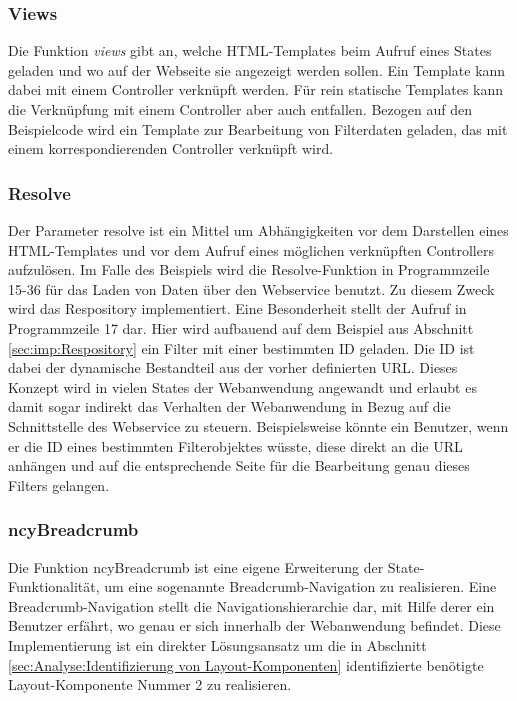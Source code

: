 \subsubsection{Views}

Die Funktion \emph{views} gibt an, welche HTML-Templates beim Aufruf eines States geladen und wo auf der Webseite sie angezeigt werden sollen. Ein Template kann dabei mit einem Controller verknüpft werden. Für rein statische Templates kann die Verknüpfung mit einem Controller aber auch entfallen. Bezogen auf den Beispielcode wird ein Template zur Bearbeitung von Filterdaten geladen, das mit einem korrespondierenden Controller verknüpft wird.

\subsubsection{Resolve}

Der Parameter resolve ist ein Mittel um Abhängigkeiten vor dem Darstellen eines HTML-Templates und vor dem Aufruf eines möglichen verknüpften Controllers aufzulösen. Im Falle des Beispiels wird die Resolve-Funktion in Programmzeile 15-36 für das Laden von Daten über den Webservice benutzt. Zu diesem Zweck wird das Respository implementiert. Eine Besonderheit stellt der Aufruf in Programmzeile 17 dar. Hier wird aufbauend auf dem Beispiel aus Abschnitt \ref{sec:imp:Respository} ein Filter mit einer bestimmten ID geladen. Die ID ist dabei der dynamische Bestandteil aus der vorher definierten \ac{URL}. Dieses Konzept wird in vielen States der Webanwendung angewandt und erlaubt es damit sogar indirekt das Verhalten der Webanwendung in Bezug auf die Schnittstelle des Webservice zu steuern. Beispielsweise könnte ein Benutzer, wenn er die ID eines bestimmten Filterobjektes wüsste, diese direkt an die \ac{URL} anhängen und auf die entsprechende Seite für die Bearbeitung genau dieses Filters gelangen.

\subsubsection{ncyBreadcrumb}

Die Funktion ncyBreadcrumb ist eine eigene Erweiterung der State-Funktionalität, um eine sogenannte Breadcrumb-Navigation zu realisieren. Eine Breadcrumb-Navigation stellt die Navigationshierarchie dar, mit Hilfe derer ein Benutzer erfährt, wo genau er sich innerhalb der Webanwendung befindet. Diese Implementierung ist ein direkter Lösungsansatz um die in Abschnitt \ref{sec:Analyse:Identifizierung von Layout-Komponenten} identifizierte benötigte Layout-Komponente Nummer 2 zu realisieren.

